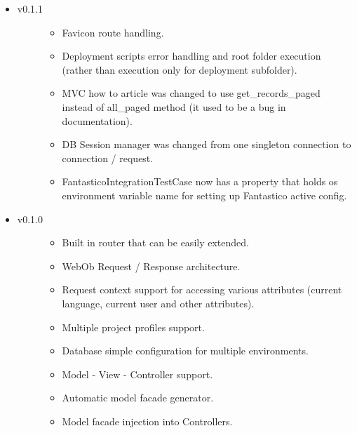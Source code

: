\documentclass[letterpaper,10pt,english]{sphinxmanual}
\begin{document}
\begin{itemize}
\item {} \begin{description}
\item[{v0.1.1}] \leavevmode\begin{itemize}
\item {} 
Favicon route handling.

\item {} 
Deployment scripts error handling and root folder execution (rather than execution only for deployment subfolder).

\item {} 
MVC how to article was changed to use get\_records\_paged instead of all\_paged method (it used to be a bug in documentation).

\item {} 
DB Session manager was changed from one singleton connection to connection / request.

\item {} 
FantasticoIntegrationTestCase now has a property that holds os environment variable name for setting up Fantastico active config.

\end{itemize}

\end{description}

\item {} \begin{description}
\item[{v0.1.0}] \leavevmode\begin{itemize}
\item {} 
Built in router that can be easily extended.

\item {} 
WebOb Request / Response architecture.

\item {} 
Request context support for accessing various attributes (current language, current user and other attributes).

\item {} 
Multiple project profiles support.

\item {} 
Database simple configuration for multiple environments.

\item {} 
Model - View - Controller support.

\item {} 
Automatic model facade generator.

\item {} 
Model facade injection into Controllers.


\end{itemize}
\end{description}
\end{itemize}
\end{document}
